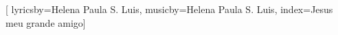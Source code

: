 %

\setcounter{songnum}{80}

[
        lyricsby={Helena Paula S. Luis}, 
        musicby={Helena Paula S. Luis},
        index={Jesus meu grande amigo}]

